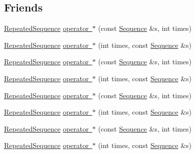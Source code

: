 \subsection*{Friends}
\begin{DoxyCompactItemize}
\item 
\mbox{\hyperlink{classfakeit_1_1RepeatedSequence}{Repeated\+Sequence}} \mbox{\hyperlink{classfakeit_1_1RepeatedSequence_ab856dedd10fec617583599e03f3c9a80}{operator $\ast$}} (const \mbox{\hyperlink{classfakeit_1_1Sequence}{Sequence}} \&s, int times)
\item 
\mbox{\hyperlink{classfakeit_1_1RepeatedSequence}{Repeated\+Sequence}} \mbox{\hyperlink{classfakeit_1_1RepeatedSequence_ae695b1e2c0f00bc6b9a49dd1efcb8f7b}{operator $\ast$}} (int times, const \mbox{\hyperlink{classfakeit_1_1Sequence}{Sequence}} \&s)
\item 
\mbox{\hyperlink{classfakeit_1_1RepeatedSequence}{Repeated\+Sequence}} \mbox{\hyperlink{classfakeit_1_1RepeatedSequence_ab856dedd10fec617583599e03f3c9a80}{operator $\ast$}} (const \mbox{\hyperlink{classfakeit_1_1Sequence}{Sequence}} \&s, int times)
\item 
\mbox{\hyperlink{classfakeit_1_1RepeatedSequence}{Repeated\+Sequence}} \mbox{\hyperlink{classfakeit_1_1RepeatedSequence_ae695b1e2c0f00bc6b9a49dd1efcb8f7b}{operator $\ast$}} (int times, const \mbox{\hyperlink{classfakeit_1_1Sequence}{Sequence}} \&s)
\item 
\mbox{\hyperlink{classfakeit_1_1RepeatedSequence}{Repeated\+Sequence}} \mbox{\hyperlink{classfakeit_1_1RepeatedSequence_ab856dedd10fec617583599e03f3c9a80}{operator $\ast$}} (const \mbox{\hyperlink{classfakeit_1_1Sequence}{Sequence}} \&s, int times)
\item 
\mbox{\hyperlink{classfakeit_1_1RepeatedSequence}{Repeated\+Sequence}} \mbox{\hyperlink{classfakeit_1_1RepeatedSequence_ae695b1e2c0f00bc6b9a49dd1efcb8f7b}{operator $\ast$}} (int times, const \mbox{\hyperlink{classfakeit_1_1Sequence}{Sequence}} \&s)
\item 
\mbox{\hyperlink{classfakeit_1_1RepeatedSequence}{Repeated\+Sequence}} \mbox{\hyperlink{classfakeit_1_1RepeatedSequence_ab856dedd10fec617583599e03f3c9a80}{operator $\ast$}} (const \mbox{\hyperlink{classfakeit_1_1Sequence}{Sequence}} \&s, int times)
\item 
\mbox{\hyperlink{classfakeit_1_1RepeatedSequence}{Repeated\+Sequence}} \mbox{\hyperlink{classfakeit_1_1RepeatedSequence_ae695b1e2c0f00bc6b9a49dd1efcb8f7b}{operator $\ast$}} (int times, const \mbox{\hyperlink{classfakeit_1_1Sequence}{Sequence}} \&s)

\end{DoxyCompactItemize}
